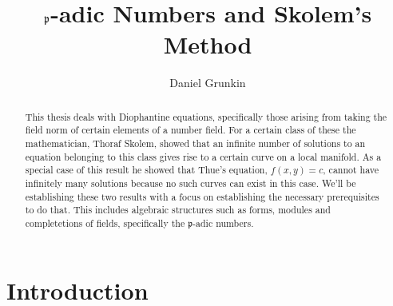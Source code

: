 \documentclass{article}
\title{$\mfrak p$-adic Numbers and Skolem's Method}
\author{Daniel Grunkin}
\date{}
\newcommand{\mfrak}[1]{\mathfrak{#1}}
\numberwithin{equation}{section}
\begin{document}
\begin{abstract}
    This thesis deals with Diophantine equations, specifically those arising from taking the field norm of certain elements of a number field. For a certain class of these the mathematician, Thoraf Skolem, showed that an infinite number of solutions to an equation belonging to this class gives rise to a certain curve on a local manifold. As a special case of this result he showed that Thue's equation, $f(x,y) = c$, cannot have infinitely many solutions because no such curves can exist in this case. We'll be establishing these two results with a focus on establishing the necessary prerequisites to do that. This includes algebraic structures such as forms, modules and completetions of fields, specifically the $\mfrak p$-adic numbers.
\end{abstract}
\maketitle



\tableofcontents
\newpage



\section{Introduction}
\end{document}
